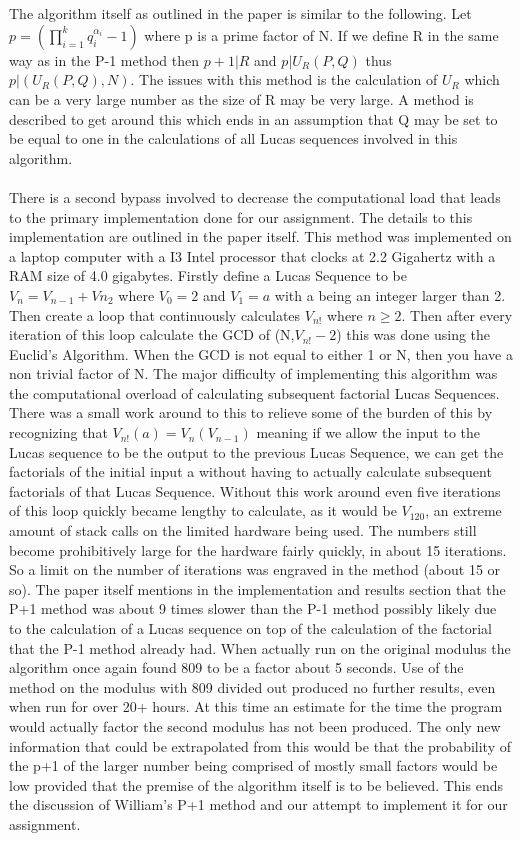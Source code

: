 \documentclass[12pt]{article} %
\begin{document}
\\\\
\indent The algorithm itself as outlined in the paper is similar to the following. Let $p = (\prod^{k}_{i=1}q^{\alpha_i}_i - 1)$ where p is a prime factor of N. If we define R in the same way as in the P-1 method then $p+1|R$ and $p|U_R(P,Q)$ thus $p|(U_R(P,Q),N)$. The issues with this method is the calculation of $U_R$ which can be a very large number as the size of R may be very large. A method is described to get around this which ends in an assumption that Q may be set to be equal to one in the calculations of all Lucas sequences involved in this algorithm. 
\\\\
\indent There is a second bypass involved to decrease the computational load that leads to the primary implementation done for our assignment. The details to this implementation are outlined in the paper itself. This method was implemented on a laptop computer with a I3 Intel processor that clocks at 2.2 Gigahertz with a RAM size of 4.0 gigabytes. Firstly define a Lucas Sequence to be $V_n = V_{n-1}+V{n_2}$ where $V_0 = 2$ and $V_1 = a$ with a being an integer larger than 2. Then create a loop that continuously calculates $V_{n!}$ where $n \geq 2$. Then after every iteration of this loop calculate the GCD of (N,$V_{n!}-2$) this was done using the Euclid's Algorithm. When the GCD is not equal to either 1 or N, then you have a non trivial factor of N. The major difficulty of implementing this algorithm was the computational overload of calculating subsequent factorial Lucas Sequences. There was a small work around to this to relieve some of the burden of this by recognizing that $V_{n!}(a) = V_n({V_{n-1}})$ meaning if we allow the input to the Lucas sequence to be the output to the previous Lucas Sequence, we can get the factorials of the initial input a without having to actually calculate subsequent factorials of that Lucas Sequence. Without this work around even five iterations of this loop quickly became lengthy to calculate, as it would be $V_120$, an extreme amount of stack calls on the limited hardware being used. The numbers still become prohibitively large for the hardware fairly quickly, in about 15 iterations. So a limit on the number of iterations was engraved in the method (about 15 or so). The paper itself mentions in the implementation and results section that the P+1 method was about 9 times slower than the P-1 method possibly likely due to the calculation of a Lucas sequence on top of the calculation of the factorial that the P-1 method already had. When actually run on the original modulus the algorithm once again found 809 to be a factor about 5 seconds. Use of the method on the modulus with 809 divided out produced no further results, even when run for over 20+ hours. At this time an estimate for the time the program would actually factor the second modulus has not been produced. The only new information that could be extrapolated from this would be that the probability of the p+1 of the larger number being comprised of mostly small factors would be low provided that the premise of the algorithm itself is to be believed. This ends the discussion of William's P+1 method and our attempt to implement it for our assignment. 
 
\end{document}
